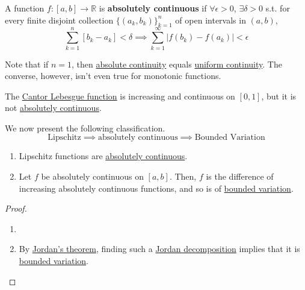  \begin{definition}
    \label{def:absolutely-continuous-function}
		A function $f: [a, b] \to \mathbb{R}$ is \textbf{absolutely continuous} if $\forall \epsilon > 0$, $\exists \delta > 0$ s.t. for every finite disjoint collection $\{(a_k, b_k)\}_{k=1}^n$ of open intervals in $(a, b)$, 
    \begin{equation}
      \sum_{k=1}^n [ b_k - a_k] < \delta \implies \sum_{k=1}^\infty |f(b_k) - f(a_k)| < \epsilon
    \end{equation}
  \end{definition}

  Note that if $n=1$, then \hyperref[def:absolutely-continuous-function]{absolute continuity} equals \hyperref[real-def:uniform-continuity]{uniform continuity}. The converse, however, isn't even true for monotonic functions. 

  \begin{example}
    \label{ex:cantor-lebesgue}
    The \hyperref[real-def:cantor-lebesgue-function-devils-staircase]{Cantor Lebesgue function} is increasing and continuous on $[0, 1]$, but it is not \hyperref[def:absolutely-continuous-function]{absolutely continuous}. 
  \end{example}

  We now present the following classification. 
  \begin{equation}
    \text{Lipschitz} \implies \text{absolutely continuous} \implies \text{Bounded Variation}
  \end{equation}

  \begin{theorem}
    \label{thm:lipschitz-functions-are-ac}
    \label{thm:ac-bv}
		\begin{enumerate}
		  \item Lipschitz functions are \hyperref[def:absolutely-continuous-function]{absolutely continuous}. 
			\item Let $f$ be absolutely continuous on $[a, b]$. Then, $f$ is the difference of increasing absolutely continuous functions, and so is of \hyperref[def:bounded-variation]{bounded variation}. 
		\end{enumerate}
  \end{theorem}
  \begin{proof}
		\begin{enumerate}
		  \item 
			\item By \hyperref[thm:jordans-theorem]{Jordan's theorem}, finding such a \hyperref[thm:jordan-decomposition-theorem]{Jordan decomposition} implies that it is \hyperref[def:bounded-variation]{bounded variation}. 
		\end{enumerate}
  \end{proof}

